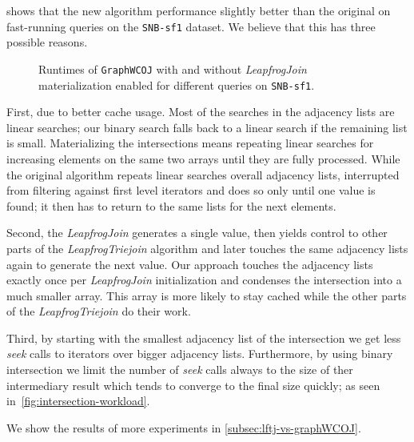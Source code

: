  shows that the new algorithm performance slightly better than
the original on fast-running queries on the \texttt{SNB-sf1} dataset.
We believe that this has three possible reasons.

\begin{figure}[H]
    \centering
    
    \caption{Runtimes of \texttt{GraphWCOJ} with and without \textit{LeapfrogJoin} materialization
    enabled for different queries on \texttt{SNB-sf1}.}
    \label{fig:mat-nomat-short}
\end{figure}

First, due to better cache usage.
Most of the searches in the adjacency lists are linear searches;
our binary search falls back to a linear search if the remaining list is small.
Materializing the intersections means repeating linear searches for increasing elements on the same
two arrays until they are fully processed.
While the original algorithm repeats linear searches overall adjacency lists, interrupted from filtering
against first level iterators and does so only until one value is found;
it then has to return to the same lists for the next elements.

Second, the \textit{LeapfrogJoin} generates a single value, then yields control to other parts
of the \textit{LeapfrogTriejoin} algorithm and later touches the same adjacency lists again to generate the next value.
Our approach touches the adjacency lists exactly once per \textit{LeapfrogJoin} initialization and
condenses the intersection into a much smaller array.
This array is more likely to stay cached while the other parts of the \textit{LeapfrogTriejoin} do their work.

Third, by starting with the smallest adjacency list of the intersection we get less \textit{seek}
calls to iterators over bigger adjacency lists.
Furthermore, by using binary intersection we limit the number of \textit{seek} calls always to the
size of ther intermediary result which tends to converge to the final size quickly; as seen in~\cref{fig:intersection-workload}.

We show the results of more experiments in \cref{subsec:lftj-vs-graphWCOJ}.